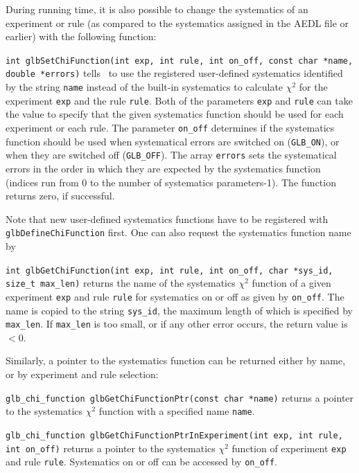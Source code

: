 During running time, it is also possible to change the systematics of an experiment or
rule (as compared to the systematics assigned in the AEDL file or earlier) with the following function:
\begin{function}
{\tt int glbSetChiFunction(int exp, int rule, int on\_off, const char *name, double *errors)}
 tells \GLOBES\ to use the registered user-defined systematics identified by the string {\tt name}
instead of the built-in systematics
to calculate $\chi^2$ for the experiment {\tt exp} and the rule {\tt rule}. 
Both of the parameters {\tt exp} and {\tt rule} can take the value  to specify that the
given systematics function should be used for each experiment or each rule. The parameter 
{\tt on\_off} determines if the systematics function should be used when systematical errors
are switched on ({\tt GLB\_ON}), or when they are switched off ({\tt GLB\_OFF}).
The array {\tt errors} sets the systematical errors in the order in which they
are expected by the systematics function (indices run from $0$ to
the number of systematics parameters-1). The function returns zero, if successful.
\end{function}
Note that new user-defined systematics functions have to be registered with {\tt glbDefineChiFunction} first. 
One can also request the systematics function name by 
\begin{function}
{\tt int glbGetChiFunction(int exp, int rule, int on\_off, char *sys\_id, size\_t max\_len)}
returns the name of the systematics $\chi^2$ function of a given experiment {\tt exp} and rule {\tt rule} for
systematics on or off as given by {\tt on\_off}. The name is copied to the string
{\tt sys\_id}, the maximum length of which is specified by {\tt max\_len}. If
{\tt max\_len} is too small, or if any other error occurs, the return value is $< 0$.
\end{function}
Similarly, a pointer to the systematics function can be returned either by name, or by experiment and rule selection:
\begin{function}
{\tt glb\_chi\_function glbGetChiFunctionPtr(const char *name)}
returns a pointer to the systematics $\chi^2$ function with a specified name {\tt name}.
\end{function}
\begin{function}
{\tt glb\_chi\_function glbGetChiFunctionPtrInExperiment(int exp, int rule, int on\_off)}
returns a pointer to the systematics $\chi^2$ function of experiment {\tt exp} and rule {\tt rule}.
Systematics on or off can be accessed by {\tt on\_off}.
\end{function}

